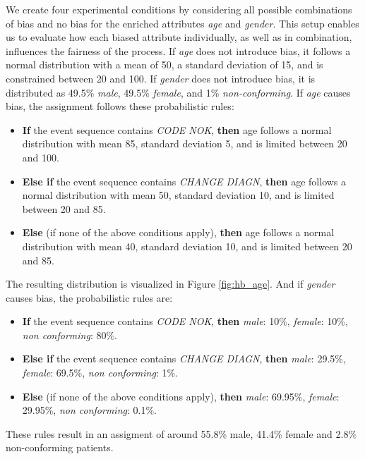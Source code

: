 We create four experimental conditions by considering all possible combinations of bias and no bias
for the enriched attributes \textit{age} and \textit{gender}.
This setup enables us to evaluate how each biased attribute individually, as well as in combination,
influences the fairness of the process.  
If \textit{age} does not introduce bias, it follows a normal distribution with a mean of 50,
a standard deviation of 15, and is constrained between 20 and 100.
If \textit{gender} does not introduce bias, it is distributed as 49.5\% \textit{male}, 49.5\% \textit{female}, and 1\% \textit{non-conforming}.  
If \textit{age} causes bias, the assignment follows these probabilistic rules:
\begin{itemize}  
    \item \textbf{If} the event sequence contains \textit{CODE NOK},
        \textbf{then} age follows a normal distribution with mean 85, standard deviation 5, and is limited between 20 and 100.  
    \item \textbf{Else if} the event sequence contains \textit{CHANGE DIAGN},
        \textbf{then} age follows a normal distribution with mean 50, standard deviation 10, and is limited between 20 and 85.  
    \item \textbf{Else} (if none of the above conditions apply),
        \textbf{then} age follows a normal distribution with mean 40, standard deviation 10, and is limited between 20 and 85.  
\end{itemize}  
The resulting distribution is visualized in Figure \ref{fig:hb_age}.
And if \textit{gender} causes bias, the probabilistic rules are:
\begin{itemize}  
    \item \textbf{If} the event sequence contains \textit{CODE NOK},
        \textbf{then} \textit{male}: 10\%, \textit{female}: 10\%, \textit{non conforming}: 80\%.  
    \item \textbf{Else if} the event sequence contains \textit{CHANGE DIAGN},
        \textbf{then} \textit{male}: 29.5\%, \textit{female}: 69.5\%, \textit{non conforming}: 1\%.  
    \item \textbf{Else} (if none of the above conditions apply),
        \textbf{then} \textit{male}: 69.95\%, \textit{female}: 29.95\%, \textit{non conforming}: 0.1\%.  
\end{itemize}  
These rules result in an assigment of around 55.8\% male, 41.4\% female and 2.8\% non-conforming patients.


